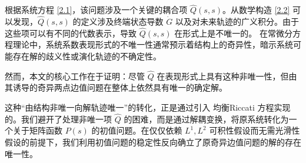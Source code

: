 \documentclass{GZUbachelorthesis}
\begin{document}
根据系统方程 \eqref{2.1}，该问题涉及一个关键的耦合项 $\hat{Q}(s,s)$。从数学构造 \eqref{2.2} 可以发现，$\hat{Q}(s,s)$ 的定义涉及终端状态导数 $\dot{G}$ 以及对未来轨迹的广义积分。由于这些项可以有不同的代数表示，导致 $\hat{Q}(s,s)$ 在形式上是不唯一的。 在常微分方程理论中，系统系数表现形式的不唯一性通常预示着结构上的奇异性，暗示系统可能存在解的歧义性或演化轨迹的不确定性。

然而，本文的核心工作在于证明：尽管 $\hat{Q}$ 在表现形式上具有这种非唯一性，但由其诱导的奇异两点边值问题在整体上依然具有唯一的确定解。

这种“由结构非唯一向解轨迹唯一”的转化，正是通过引入 均衡Riccati 方程实现的。我们避开了处理非唯一项 $\hat{Q}$ 的困难，而是通过解耦变换，将原系统转化为一个关于矩阵函数 $P(s)$ 的初值问题。在仅仅依赖 $L^1, L^2$ 可积性假设而无需光滑性假设的前提下，我们利用初值问题的稳定性反向确立了原奇异边值问题的解的存在唯一性。
\end{document}
